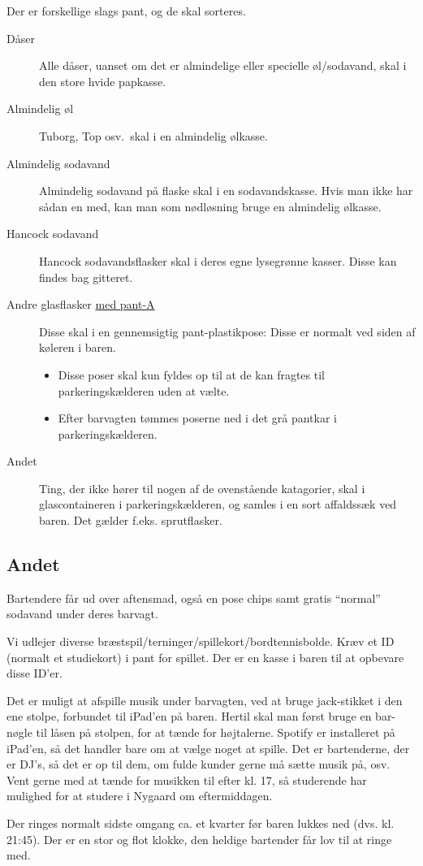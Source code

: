 Der er forskellige slags pant, og de skal sorteres.
\begin{description}
\item[Dåser] Alle dåser, uanset om det er almindelige eller specielle
  øl/sodavand, skal i den store hvide papkasse.
\item[Almindelig øl] Tuborg, Top osv.\ skal i en almindelig ølkasse.
\item[Almindelig sodavand] Almindelig sodavand på flaske skal i en
  sodavandskasse. Hvis man ikke har sådan en med, kan man som
  nødløsning bruge en almindelig ølkasse.%
  \item[Hancock sodavand] Hancock sodavandsflasker skal i deres egne lysegrønne kasser. Disse kan findes bag gitteret.
\item[Andre glasflasker \underline{med pant-A}] Disse skal i en gennemsigtig
  pant-plastikpose: Disse er normalt ved siden af køleren i baren.
  \begin{itemize}
    \item Disse poser skal kun fyldes op til at de kan fragtes til parkeringskælderen uden at vælte.
    \item Efter barvagten tømmes poserne ned i det grå pantkar i parkeringskælderen.
  \end{itemize}
\item[Andet] Ting, der ikke hører til nogen af de ovenstående
  katagorier, skal i glascontaineren i parkeringskælderen, 
  og samles i en sort affaldssæk ved baren. Det gælder f.eks. sprutflasker.
\end{description}

\subsection{Andet}
\label{sec:intra:andet}

Bartendere får ud over aftensmad, også en pose chips samt gratis
``normal'' sodavand under deres barvagt.

Vi udlejer diverse
bræstspil/terninger/spillekort/bordtennisbolde. Kræv et ID (normalt et
studiekort) i pant for spillet. Der er en kasse i baren til at
opbevare disse ID'er.

Det er muligt at afspille musik under barvagten, ved at bruge
jack-stikket i den ene stolpe, forbundet til iPad'en på baren. 
Hertil skal man først bruge en bar-nøgle
til låsen på stolpen, for at tænde for højtalerne. 
Spotify er installeret på iPad'en, så det handler bare om at vælge noget at spille.
Det er bartenderne, der er DJ's, så det er op til dem, 
om fulde kunder gerne må sætte musik på, osv.
Vent gerne med at tænde for musikken til efter kl. 17, så studerende har mulighed
for at studere i Nygaard om eftermiddagen. 

Der ringes normalt sidste omgang ca. et kvarter før baren lukkes ned
(dvs. kl. 21:45). Der er en stor og flot klokke, den heldige bartender
får lov til at ringe med.
